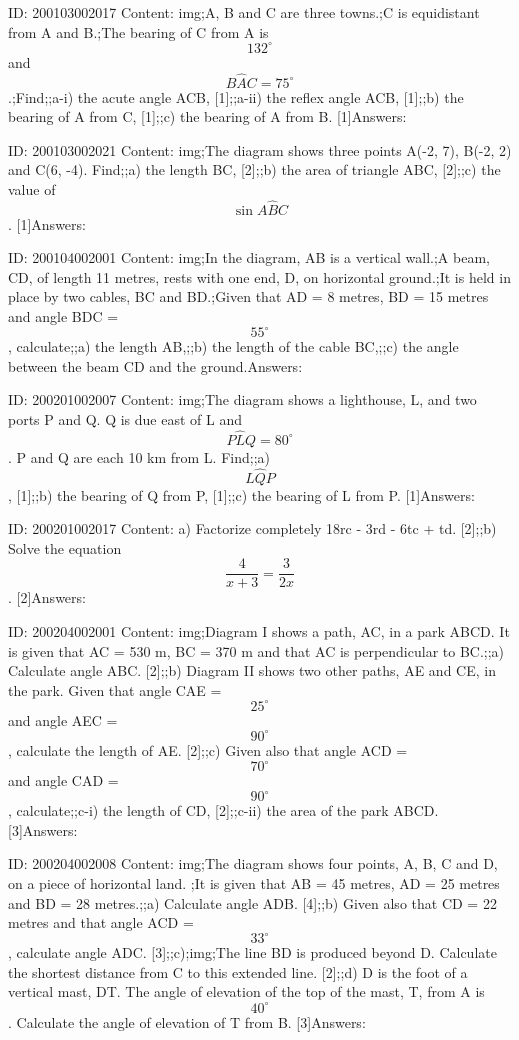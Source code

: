 \documentclass{article}
\begin{document}
ID: 200103002017
Content:
img;A, B and C are three towns.;C is equidistant from A and B.;The bearing of C from A is $$132^{\circ}$$ and $$B \hat AC = 75^{\circ}$$.;Find;;a-i) the acute angle ACB, [1];;a-ii) the reflex angle ACB, [1];;b) the bearing of A from C, [1];;c) the bearing of A from B.    [1]Answers:

ID: 200103002021
Content:
img;The diagram shows three points A(-2, 7), B(-2, 2) and C(6, -4). Find;;a) the length BC,    [2];;b) the area of triangle ABC,    [2];;c) the value of $$\sin A \hat BC$$.    [1]Answers:

ID: 200104002001
Content:
img;In the diagram, AB is a vertical wall.;A beam, CD, of length 11 metres, rests with one end, D, on horizontal ground.;It is held in place by two cables, BC and BD.;Given that AD = 8 metres, BD = 15 metres and angle BDC = $$55^{\circ}$$, calculate;;a) the length AB,;;b) the length of the cable BC,;;c) the angle between the beam CD and the ground.Answers:

ID: 200201002007
Content:
img;The diagram shows a lighthouse, L, and two ports P and Q. Q is due east of L and $$P \hat LQ=80^{\circ}$$. P and Q are each 10 km from L. Find;;a) $$L \hat QP$$, [1];;b) the bearing of Q from P, [1];;c) the bearing of L from P. [1]Answers:

ID: 200201002017
Content:
a) Factorize completely 18rc - 3rd - 6tc + td. [2];;b) Solve the equation $$\frac{4}{x+3}=\frac{3}{2x}$$. [2]Answers:

ID: 200204002001
Content:
img;Diagram I shows a path, AC, in a park ABCD. It is given that AC = 530 m, BC = 370 m and that AC is perpendicular to BC.;;a) Calculate angle ABC.   [2];;b) Diagram II shows two other paths, AE and CE, in the park. Given that angle CAE = $$25^{\circ}$$ and angle AEC = $$90^{\circ}$$, calculate the length of AE.   [2];;c) Given also that angle ACD = $$70^{\circ}$$ and angle CAD = $$90^{\circ}$$, calculate;;c-i) the length of CD,   [2];;c-ii) the area of the park ABCD.   [3]Answers:

ID: 200204002008
Content:
img;The diagram shows four points, A, B, C and D, on a piece of horizontal land. ;It is given that AB = 45 metres, AD = 25 metres and BD = 28 metres.;;a) Calculate angle ADB.   [4];;b) Given also that CD = 22 metres and that angle ACD = $$33^{\circ}$$, calculate angle ADC.   [3];;c);img;The line BD is produced beyond D. Calculate the shortest distance from C to this extended line.   [2];;d) D is the foot of a vertical mast, DT. The angle of elevation of the top of the mast, T, from A is $$40^{\circ}$$. Calculate the angle of elevation of T from B.   [3]Answers:
\end{document}
